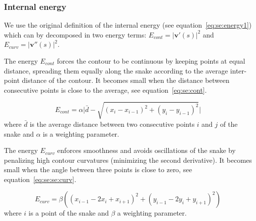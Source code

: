 \subsubsection{Internal energy}
We use the original definition of the internal energy (see equation~\ref{eq:se:energy1}) which can by decomposed in two energy terms: $E_{cont} = \left|\mathbf{v}'(s) \right|^2$ and $E_{curv}=\left| \mathbf{v}''(s) \right|^2$.
% 

The energy $E_{cont}$ forces the contour to be continuous by keeping points at equal distance, spreading them equally along the snake according to the average inter-point distance of the contour.
It becomes small when the distance between consecutive points is close to the average, see equation~\ref{eq:se:cont}.

\begin{equation}\label{eq:se:cont}
 E_{cont} = \alpha \Big|\bar{d} - \sqrt{(x_i - x_{i-1} )^2 + (y_i - y_{i-1} )^2}\Big|
\end{equation}
where $\bar{d}$ is the average distance between two consecutive points $i$ and $j$ of the snake and $\alpha$ is a weighting parameter.

The energy $E_{curv}$ enforces smoothness and avoids oscillations of the snake by penalizing high contour curvatures (minimizing the second derivative).
It becomes small when the angle between three points is close to zero, see equation~\ref{eq:se:se:curv}.

\begin{equation}\label{eq:se:se:curv}
  E_{curv} = \beta \left( (x_{i-1} - 2x_{i} + x_{i+1})^2 + (y_{i-1} - 2y_{i} + y_{i+1})^2 \right)
\end{equation}
where $i$ is a point of the snake and $\beta$ a weighting parameter.


